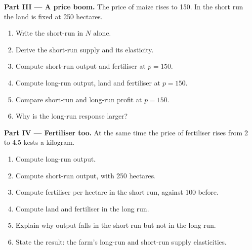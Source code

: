 \begin{problem}
\medskip\noindent\textbf{Part III --- A price boom.} The price of maize rises to 150.
In the short run the land is fixed at 250 hectares.
\begin{enumerate}[resume]
  \item Write the short-run  in $N$ alone.
  \item Derive the short-run supply and its elasticity.
  \item Compute short-run output and fertiliser at $p = 150$.
  \item Compute long-run output, land and fertiliser at $p = 150$.
  \item Compare short-run and long-run profit at $p = 150$.
  \item Why is the long-run response larger?
\end{enumerate}

\medskip\noindent\textbf{Part IV --- Fertiliser too.} At the same time the price of
fertiliser rises from 2 to 4.5 kests a kilogram.
\begin{enumerate}[resume]
  \item Compute long-run output.
  \item Compute short-run output, with 250 hectares.
  \item Compute fertiliser per hectare in the short run, against 100 before.
  \item Compute land and fertiliser in the long run.
  \item Explain why output falls in the short run but not in the long run.
  \item State the result: the farm's long-run and short-run supply elasticities.
\end{enumerate}
\end{problem}
